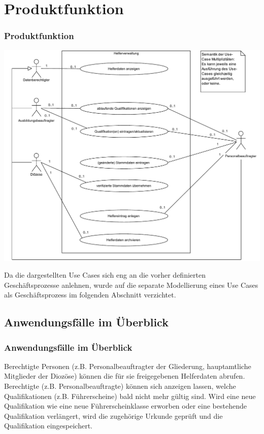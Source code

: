 \documentclass{beamer}
\begin{document}
\section{Produktfunktion}		
\begin{frame}
\frametitle{Produktfunktion}
\begin{minipage}{0.6 \textwidth}
\includegraphics[height=0.75 \textheight]{PDF/Use_Case.pdf}
\end{minipage}
\hfill
\begin{minipage}{0.3 \textwidth}
	Da die dargestellten Use Cases sich eng an die vorher definierten Geschäftsprozesse anlehnen, wurde auf die separate Modellierung eines Use Cases als Geschäftsprozess im folgenden Abschnitt verzichtet.
\end{minipage}
\end{frame}

\subsection{Anwendungsfälle im Überblick}		
\begin{frame}
\frametitle{Anwendungsfälle im Überblick}
\begin{acronym}
	 {Berechtigte Personen (z.B. Personalbeauftragter der Gliederung, hauptamtliche Mitglieder der Diozöse) können die für sie freigegebenen Helferdaten abrufen.}
	 {Berechtigte (z.B. Personalbeauftragte) können sich anzeigen lassen, welche Qualifikationen (z.B. Führerscheine) bald nicht mehr gültig sind.}
		 {Wird eine neue Qualifikation wie eine neue Führerscheinklasse erworben oder eine bestehende Qualifikation verlängert, wird die zugehörige Urkunde geprüft und die Qualifikation eingespeichert.}
	\end{acronym}
\end{frame}
\end{document}
